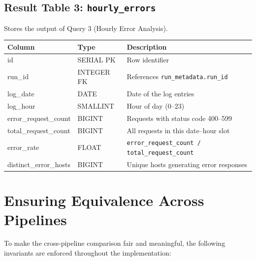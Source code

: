 \documentclass[11pt,a4paper]{article}
\begin{document}
\subsection{Result Table 3: \texttt{hourly\_errors}}

Stores the output of Query 3 (Hourly Error Analysis).

\begin{schematable}
\begin{tabularx}{\linewidth}{@{} >{\ttfamily\small}l >{\small}l X @{}}
\toprule
\textnormal{\textbf{Column}} & \textbf{Type} & \textbf{Description} \\
\midrule
id                    & SERIAL PK  & Row identifier \\
run\_id               & INTEGER FK & References \texttt{run\_metadata.run\_id} \\
log\_date             & DATE       & Date of the log entries \\
log\_hour             & SMALLINT   & Hour of day (0--23) \\
error\_request\_count  & BIGINT     & Requests with status code 400--599 \\
total\_request\_count  & BIGINT     & All requests in this date--hour slot \\
error\_rate           & FLOAT      & \texttt{error\_request\_count / total\_request\_count} \\
distinct\_error\_hosts & BIGINT     & Unique hosts generating error responses \\
\bottomrule
\end{tabularx}
\end{schematable}

\section{Ensuring Equivalence Across Pipelines}

To make the cross-pipeline comparison fair and meaningful, the following invariants are enforced throughout the implementation:
\end{document}
